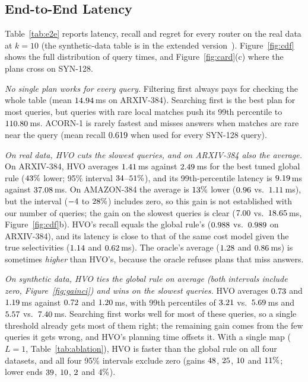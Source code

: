 \documentclass[sigconf, nonacm]{acmart}
\begin{document}
\subsection{End-to-End Latency}\label{sec:eval_e2e}
Table~\ref{tab:e2e} reports latency, recall and regret for every router on the real data at $k=10$ (the synthetic-data table is in the extended version~\cite{hvoextended}). Figure~\ref{fig:cdf} shows the full distribution of query times, and Figure~\ref{fig:card}(c) where the plans cross on SYN-128.

\emph{No single plan works for every query.} Filtering first always pays for checking the whole table (mean $14.94$\,ms on ARXIV-384). Searching first is the best plan for most queries, but queries with rare local matches push its 99th percentile to $110.80$\,ms. ACORN-1 is rarely fastest and misses answers when matches are rare near the query (mean recall $0.619$ when used for every SYN-128 query).

\emph{On real data, HVO cuts the slowest queries, and on ARXIV-384 also the average.} On ARXIV-384, HVO averages $1.41$\,ms against $2.49$\,ms for the best tuned global rule ($43\%$ lower; 95\% interval $34$--$51\%$), and its 99th-percentile latency is $9.19$\,ms against $37.08$\,ms. On AMAZON-384 the average is $13\%$ lower ($0.96$ vs.\ $1.11$\,ms), but the interval ($-4$ to $28\%$) includes zero, so this gain is not established with our number of queries; the gain on the slowest queries is clear ($7.00$ vs.\ $18.65$\,ms, Figure~\ref{fig:cdf}b). HVO's recall equals the global rule's ($0.988$ vs.\ $0.989$ on ARXIV-384), and its latency is close to that of the same cost model given the true selectivities ($1.14$ and $0.62$\,ms). The oracle's average ($1.28$ and $0.86$\,ms) is sometimes \emph{higher} than HVO's, because the oracle refuses plans that miss answers.

\emph{On synthetic data, HVO ties the global rule on average (both intervals include zero, Figure~\ref{fig:gainci}) and wins on the slowest queries.} HVO averages $0.73$ and $1.19$\,ms against $0.72$ and $1.20$\,ms, with 99th percentiles of $3.21$ vs.\ $5.69$\,ms and $5.57$ vs.\ $7.40$\,ms. Searching first works well for most of these queries, so a single threshold already gets most of them right; the remaining gain comes from the few queries it gets wrong, and HVO's planning time offsets it. With a single map ($L=1$, Table~\ref{tab:ablation}), HVO is faster than the global rule on all four datasets, and all four 95\% intervals exclude zero (gains $48$, $25$, $10$ and $11\%$; lower ends $39$, $10$, $2$ and $4\%$).
\end{document}
